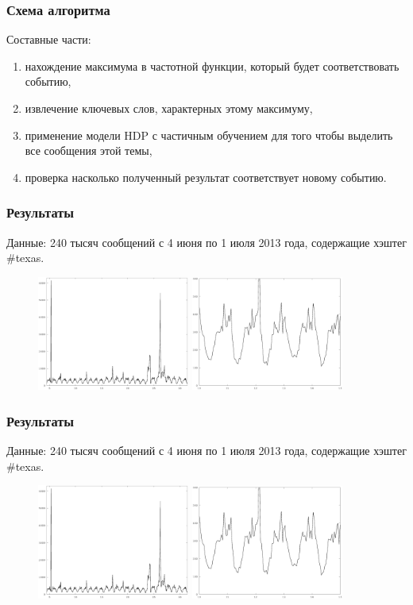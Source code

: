 \documentclass[10pt,pdf,hyperref={unicode}]{beamer}
\begin{document}
\begin{frame}
  \frametitle{Схема алгоритма}
  Составные части:
  \begin{enumerate}  
  \item нахождение максимума в частотной функции, который будет соответствовать событию,
  \item извлечение ключевых слов, характерных этому максимуму,
  \item применение модели HDP с частичным обучением для того чтобы выделить все сообщения этой темы,
  \item проверка насколько полученный результат соответствует новому событию.
  \end{enumerate}
\end{frame}

\begin{frame}
  \frametitle{Результаты}
  Данные: 240 тысяч сообщений с 4 июня по 1 июля 2013 года, содержащие хэштег \#texas.
  \begin{figure}[H]
  \centering
  \includegraphics[width=5.0cm]{all-freq.eps}
  \includegraphics[width=5.0cm]{all-freq-scaled.eps}
  \end{figure}
\end{frame}

\begin{frame}
  \frametitle{Результаты}
  Данные: 240 тысяч сообщений с 4 июня по 1 июля 2013 года, содержащие хэштег \#texas.
  \begin{figure}[H]
  \centering
  \includegraphics[width=5.0cm]{all-freq.eps}
  \includegraphics[width=5.0cm]{all-freq-scaled.eps}
  \end{figure}
\end{frame}
\end{document}
